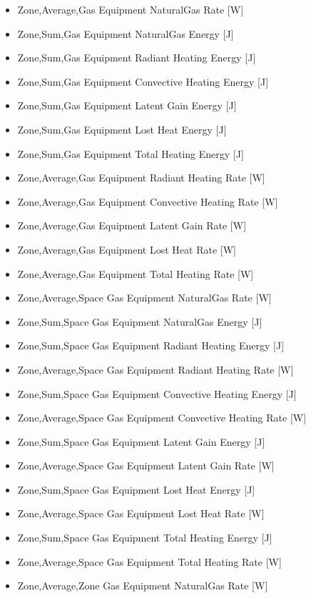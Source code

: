 \begin{itemize}
\item
  Zone,Average,Gas Equipment NaturalGas Rate {[}W{]}
\item
  Zone,Sum,Gas Equipment NaturalGas Energy {[}J{]}
\item
  Zone,Sum,Gas Equipment Radiant Heating Energy {[}J{]}
\item
  Zone,Sum,Gas Equipment Convective Heating Energy {[}J{]}
\item
  Zone,Sum,Gas Equipment Latent Gain Energy {[}J{]}
\item
  Zone,Sum,Gas Equipment Lost Heat Energy {[}J{]}
\item
  Zone,Sum,Gas Equipment Total Heating Energy {[}J{]}
\item
  Zone,Average,Gas Equipment Radiant Heating Rate {[}W{]}
\item
  Zone,Average,Gas Equipment Convective Heating Rate {[}W{]}
\item
  Zone,Average,Gas Equipment Latent Gain Rate {[}W{]}
\item
  Zone,Average,Gas Equipment Lost Heat Rate {[}W{]}
\item
  Zone,Average,Gas Equipment Total Heating Rate {[}W{]}
\item
  Zone,Average,Space Gas Equipment NaturalGas Rate {[}W{]}
\item
  Zone,Sum,Space Gas Equipment NaturalGas Energy {[}J{]}
\item
  Zone,Sum,Space Gas Equipment Radiant Heating Energy {[}J{]}
\item
  Zone,Average,Space Gas Equipment Radiant Heating Rate {[}W{]}
\item
  Zone,Sum,Space Gas Equipment Convective Heating Energy {[}J{]}
\item
  Zone,Average,Space Gas Equipment Convective Heating Rate {[}W{]}
\item
  Zone,Sum,Space Gas Equipment Latent Gain Energy {[}J{]}
\item
  Zone,Average,Space Gas Equipment Latent Gain Rate {[}W{]}
\item
  Zone,Sum,Space Gas Equipment Lost Heat Energy {[}J{]}
\item
  Zone,Average,Space Gas Equipment Lost Heat Rate {[}W{]}
\item
  Zone,Sum,Space Gas Equipment Total Heating Energy {[}J{]}
\item
  Zone,Average,Space Gas Equipment Total Heating Rate {[}W{]}
\item
  Zone,Average,Zone Gas Equipment NaturalGas Rate {[}W{]}

\end{itemize}
